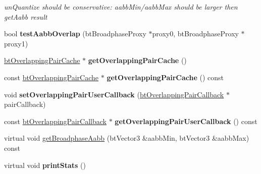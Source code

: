 \begin{DoxyCompactItemize}
\begin{DoxyCompactList}\small\item\em un\+Quantize should be conservative\+: aabb\+Min/aabb\+Max should be larger then \textquotesingle{}get\+Aabb\textquotesingle{} result \end{DoxyCompactList}\item 
\mbox{\label{classbtAxisSweep3Internal_a24ac067f6bebde7e1905620d89c83686}} 
bool {\bfseries test\+Aabb\+Overlap} (bt\+Broadphase\+Proxy $\ast$proxy0, bt\+Broadphase\+Proxy $\ast$proxy1)
\item 
\mbox{\label{classbtAxisSweep3Internal_a501f2bbdc02b65b9ea0a2b42e3237841}} 
\hyperlink{classbtOverlappingPairCache}{bt\+Overlapping\+Pair\+Cache} $\ast$ {\bfseries get\+Overlapping\+Pair\+Cache} ()
\item 
\mbox{\label{classbtAxisSweep3Internal_a5a6c14389040519c9c534908c2eb8498}} 
const \hyperlink{classbtOverlappingPairCache}{bt\+Overlapping\+Pair\+Cache} $\ast$ {\bfseries get\+Overlapping\+Pair\+Cache} () const
\item 
\mbox{\label{classbtAxisSweep3Internal_ae8602eb252ae2085960583bd4f8e7451}} 
void {\bfseries set\+Overlapping\+Pair\+User\+Callback} (\hyperlink{classbtOverlappingPairCallback}{bt\+Overlapping\+Pair\+Callback} $\ast$pair\+Callback)
\item 
\mbox{\label{classbtAxisSweep3Internal_ad76e960a9d725351f5c19aee227db2e8}} 
const \hyperlink{classbtOverlappingPairCallback}{bt\+Overlapping\+Pair\+Callback} $\ast$ {\bfseries get\+Overlapping\+Pair\+User\+Callback} () const
\item 
virtual void \hyperlink{classbtAxisSweep3Internal_ad1e0037e1ed62ef5049389bb4e8fd5b5}{get\+Broadphase\+Aabb} (bt\+Vector3 \&aabb\+Min, bt\+Vector3 \&aabb\+Max) const
\item 
\mbox{\label{classbtAxisSweep3Internal_a5fe22bd436bcafe8f17b939cc6803a2d}} 
virtual void {\bfseries print\+Stats} ()
\item 
\mbox{\label{classbtAxisSweep3Internal_ad90bd2c40561f5151dee7a938a0afe44}} 

\end{DoxyCompactItemize}
